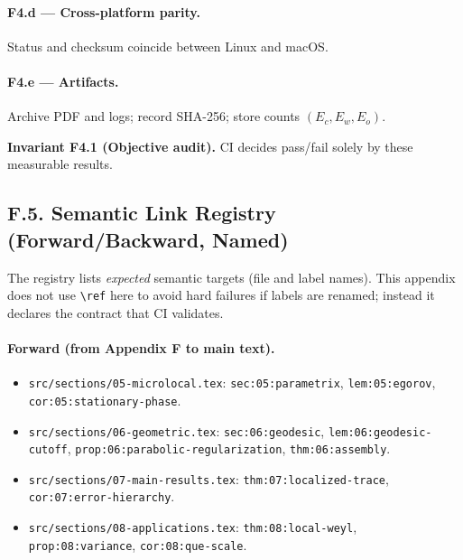 \paragraph{F4.d — Cross-platform parity.}
Status and checksum coincide between Linux and macOS.

\paragraph{F4.e — Artifacts.}
Archive PDF and logs; record SHA-256; store counts $(E_c,E_w,E_o)$.

\noindent\textbf{Invariant F4.1 (Objective audit).} CI decides pass/fail solely by these measurable results.


\subsection*{F.5. Semantic Link Registry (Forward/Backward, Named)}

\noindent
The registry lists \emph{expected} semantic targets (file and label names). 
This appendix does not use \verb|\ref| here to avoid hard failures if labels are renamed;
instead it declares the contract that CI validates.

\paragraph{Forward (from Appendix F to main text).}
\begin{itemize}
  \item \texttt{src/sections/05-microlocal.tex}: \texttt{sec:05:parametrix}, \texttt{lem:05:egorov}, \texttt{cor:05:stationary-phase}.
  \item \texttt{src/sections/06-geometric.tex}: \texttt{sec:06:geodesic}, \texttt{lem:06:geodesic-cutoff}, \texttt{prop:06:parabolic-regularization}, \texttt{thm:06:assembly}.
  \item \texttt{src/sections/07-main-results.tex}: \texttt{thm:07:localized-trace}, \texttt{cor:07:error-hierarchy}.
  \item \texttt{src/sections/08-applications.tex}: \texttt{thm:08:local-weyl}, \texttt{prop:08:variance}, \texttt{cor:08:que-scale}.
\end{itemize}


